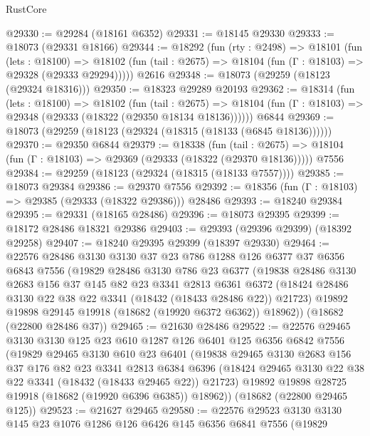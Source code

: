 \begin{lexlean}{RustCore}
\begin{coremodule}
@29330 := @29284 (@18161 @6352)
@29331 := @18145 @29330
@29333 := @18073 (@29331 @18166)
@29344 := @18292
    (fun (rty : @2498) =>
    @18101
      (fun (lets : @18100) =>
      @18102 (fun (tail : @2675) => @18104 (fun (Γ : @18103) => @29328 (@29333 @29294)))))
    @2616
@29348 := @18073 (@29259 (@18123 (@29324 @18316)))
@29350 := @18323 @29289 @20193
@29362 := @18314
    (fun (lets : @18100) =>
    @18102
      (fun (tail : @2675) =>
      @18104 (fun (Γ : @18103) => @29348 (@29333 (@18322 (@29350 @18134 @18136))))))
    @6844
@29369 := @18073 (@29259 (@18123 (@29324 (@18315 (@18133 (@6845 @18136))))))
@29370 := @29350 @6844
@29379 := @18338
    (fun (tail : @2675) => @18104 (fun (Γ : @18103) => @29369 (@29333 (@18322 (@29370 @18136)))))
    @7556
@29384 := @29259 (@18123 (@29324 (@18315 (@18133 @7557))))
@29385 := @18073 @29384
@29386 := @29370 @7556
@29392 := @18356 (fun (Γ : @18103) => @29385 (@29333 (@18322 @29386))) @28486
@29393 := @18240 @29384
@29395 := @29331 (@18165 @28486)
@29396 := @18073 @29395
@29399 := @18172 @28486 @18321 @29386
@29403 := @29393 (@29396 @29399) (@18392 @29258)
@29407 := @18240 @29395 @29399 (@18397 @29330)
@29464 := @22576
    @28486
    @3130
    @3130
    @37
    @23
    @786
    @1288
    @126
    @6377
    @37
    @6356
    @6843
    @7556
    (@19829
      @28486
      @3130
      @786
      @23
      @6377
      (@19838
        @28486
        @3130
        @2683
        @156
        @37
        @145
        @82
        @23
        @3341
        @2813
        @6361
        @6372
        (@18424 @28486 @3130 @22 @38 @22 @3341 (@18432 (@18433 @28486 @22)) @21723)
        @19892
        @19898
        @29145
        @19918
        (@18682 (@19920 @6372 @6362))
        @18962))
    (@18682 (@22800 @28486 @37))
@29465 := @21630 @28486
@29522 := @22576
    @29465
    @3130
    @3130
    @125
    @23
    @610
    @1287
    @126
    @6401
    @125
    @6356
    @6842
    @7556
    (@19829
      @29465
      @3130
      @610
      @23
      @6401
      (@19838
        @29465
        @3130
        @2683
        @156
        @37
        @176
        @82
        @23
        @3341
        @2813
        @6384
        @6396
        (@18424 @29465 @3130 @22 @38 @22 @3341 (@18432 (@18433 @29465 @22)) @21723)
        @19892
        @19898
        @28725
        @19918
        (@18682 (@19920 @6396 @6385))
        @18962))
    (@18682 (@22800 @29465 @125))
@29523 := @21627 @29465
@29580 := @22576
    @29523
    @3130
    @3130
    @145
    @23
    @1076
    @1286
    @126
    @6426
    @145
    @6356
    @6841
    @7556
    (@19829

\end{coremodule}
\end{lexlean}
